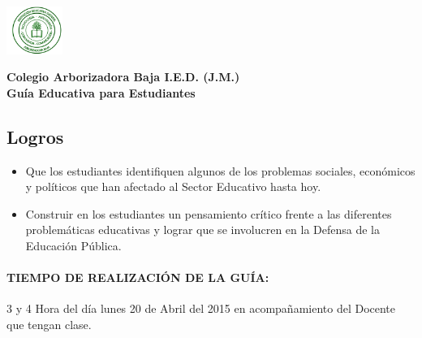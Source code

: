 \documentclass[10pt,twoside]{article}
\author{Comité sindical}
\date{}
\begin{document}
\begin{minipage}{.2\textwidth}
\includegraphics[height=1.55cm]{Images/logo-colegio.png}\end{minipage}
\begin{minipage}{.75\textwidth}
\begin{center}
\textbf{\large Colegio Arborizadora Baja I.E.D. (J.M.)}\\
\textbf{\large Guía Educativa para Estudiantes}\\
\end{center}
\end{minipage}\hfill
\subsection*{Logros}
\begin{itemize}
\item Que los estudiantes identifiquen algunos de los problemas sociales, económicos y políticos  que han afectado al Sector Educativo hasta hoy.
\item Construir en los estudiantes un pensamiento crítico frente a las diferentes problemáticas educativas y lograr que se involucren en la Defensa de la Educación Pública.
\end{itemize}
\paragraph*{TIEMPO DE REALIZACIÓN DE LA GUÍA:}3 y 4 Hora del día lunes 20 de Abril del 2015 en acompañamiento del Docente que tengan clase.
\end{document}
